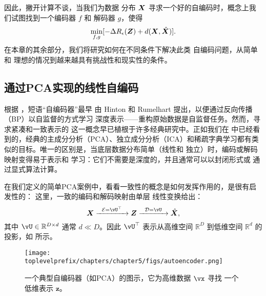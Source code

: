 \documentclass[../../book-main.tex]{subfiles}
\begin{document}
因此，撇开计算不谈，当我们为数据
分布 $\bm{X}$ 寻求一个好的自编码时，概念上我们试图找到一个编码器 $f$ 和
解码器 $g$，使得
\begin{equation}
  \min_{f, g} [- \Delta R_{\epsilon}(\bm{Z}) + d(\bm{X}, \hat {\bm{X}})].
  \label{eqn:autoencode-objective-ch5}
\end{equation}
在本章的其余部分，我们将研究如何在不同条件下解决此类
自编码问题，从简单和
理想的情况到越来越具有挑战性和现实性的条件。


\subsection{通过PCA实现的线性自编码}
根据 \cite{Baldi2011}，短语“自编码器”最早
由 Hinton 和 Rumelhart \cite{Rumelhart1986} 提出，以便通过反向传播（BP）以自监督的方式学习
深度表示——重构原始数据是自监督任务。然而，寻求紧凑和一致表示的
这一概念早已植根于许多经典研究中。正如我们在  中已经看到的，经典的主成分分析（PCA）、独立成分分析（ICA）和稀疏字典学习都有类似的目标。唯一的区别是，当底层数据分布简单（线性和
独立）时，编码或解码映射变得易于表示和
学习：它们不需要是深度的，并且通常可以以封闭形式或
通过显式算法计算。

在我们定义的简单PCA案例中，看看一致性的概念是如何发挥作用的，是很有启发性的：
这里，一致的编码和解码映射由单层
线性变换给出：
\begin{equation}
  \X \xrightarrow{\hspace{2mm} \mathcal{E} = \vU^\top \hspace{2mm}}
  \Z \xrightarrow{\hspace{2mm} \mathcal{D} = \vU \hspace{2mm}}   \hat{\X},
  \label{eqn:autoencoding-PCA-2}
\end{equation}
其中 $\vU \in \mathbb{R}^{D\times d}$ 通常 $d\ll D$。因此
$\vU^\top$ 表示从高维空间
$\mathbb{R}^{D}$ 到低维空间 $\mathbb{R}^{d}$ 的投影，如
 所示。
\begin{figure}
  \centering \texttt{[image: \\toplevelprefix/chapters/chapter5/figs/autoencoder.png]}
  \caption{一个典型自编码器（如PCA）的图示，它为高维数据 $\vx$ 寻找
  一个低维表示 $\bm{z}$。}
  \label{fig:AE}
\end{figure}
\end{document}
